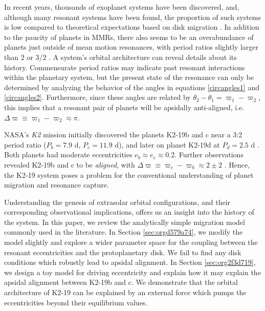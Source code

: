 \documentclass{mnras}
\begin{document}
In recent years, thousands of exoplanet systems have been discovered,
and, although many resonant systems have been found, the proportion of
such systems is low compared to theoretical expectations based on disk
migration \cite{fabrycky_architecture_2014}.  In addition to the paucity
of planets in MMRs, there also seems to be an overabundance of planets
just outside of mean motion resonances, with period ratios slightly
larger than 2 or 3/2
\cite{fabrycky_architecture_2014,choksi_sub-neptune_2020}.
A system's orbital architecture can reveal details about its history.
Commensurate period ratios may indicate past resonant interactions
within the planetary system, but the present state of the resonance
can only be determined by analyzing the behavior of the angles in
equations \eqref{circangles1} and \eqref{circangles2}.  Furthermore, since these angles are
related by \(\theta_2-\theta_1=\varpi_1-\varpi_2\), this implies that a
resonant pair of planets will be apsidally anti-aligned, i.e.
\(\Delta\varpi\equiv \varpi_1-\varpi_2\approx \pi\).

NASA's \emph{K2} mission initially discovered the planets K2-19b and c
near a 3:2 period ratio (\(P_b=7.9\) d, \(P_c=11.9\) d), and later on
planet K2-19d at \(P_d=2.5\) d
\cite{howell14_k2_mission,armstrong15_one_closes_exopl_pairs_to,sinukoff16_eleven_multip_system_fromk_masses}.
Both planets had moderate eccentricities \(e_b\approx e_c\approx 0.2\).
Further observations revealed K2-19b and c to be \emph{aligned}, with
\(\Delta\varpi\equiv \varpi_c-\varpi_b \approx 2\pm 2\)
\cite{petigura_k2-19b_2020}.  Hence, the K2-19 system poses a problem
for the conventional understanding of planet migration and resonance
capture.

Understanding the genesis of extrasolar orbital configurations, and
their corresponding observational implications, offers us an insight
into the history of the system.  In this paper, we review the
analytically simple migration model commonly used in the literature.
In Section \ref{sec:orgd579a74}, we modify the model slightly and explore
a wider parameter space for the coupling between the resonant
eccentricities and the protoplanetary disk. We fail to find any disk
conditions which robustly lead to apsidal alignment.  In Section
\ref{sec:org2f3d719}, we design a toy model for driving eccentricity and
explain how it may explain the apsidal alignment between K2-19b and
c. We demonstrate that the orbital architecture of K2-19 can be
explained by an external force which pumps the eccentricities beyond
their equilibrium values.
\end{document}
